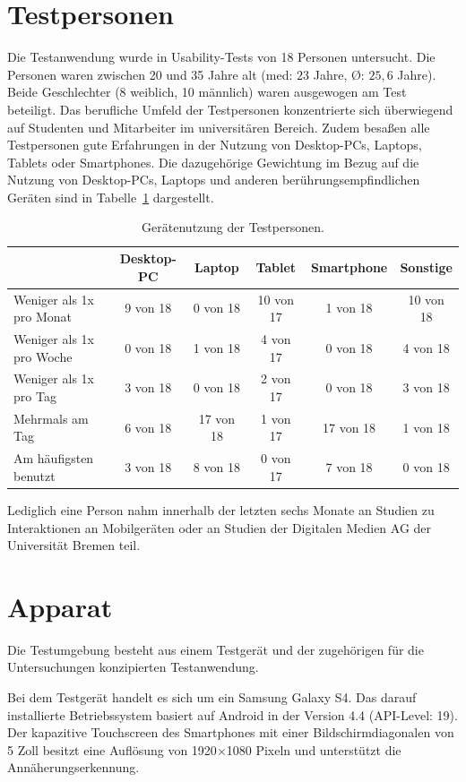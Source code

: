\documentclass[12pt,numbers=noenddot,parskip,bibliography=totocnumbered,listof=totocnumbered]{scrreprt}
\begin{document}
\section{Testpersonen}
Die Testanwendung wurde in Usability-Tests von 18 Personen untersucht. Die Personen waren zwischen 20 und 35 Jahre alt (med: $23$ Jahre, \O: $25{,}6$ Jahre). Beide Geschlechter (8 weiblich, 10 männlich) waren ausgewogen am Test beteiligt. Das berufliche Umfeld der Testpersonen konzentrierte sich überwiegend auf Studenten und Mitarbeiter im universitären Bereich. Zudem besaßen alle Testpersonen gute Erfahrungen in der Nutzung von Desktop-PCs, Laptops, Tablets oder Smartphones. Die dazugehörige Gewichtung im Bezug auf die Nutzung von Desktop-PCs, Laptops und anderen berührungsempfindlichen Geräten sind in Tabelle~\ref{nutzungtestpersonen} dargestellt.
\begin{table}
\centering
\renewcommand{\arraystretch}{2}
\setlength{\tabcolsep}{2.2pt}
\begin{tabular}{ p{4.8cm} | c c c c c}
& Desktop-PC & Laptop & Tablet & Smartphone & Sonstige\\\hline
Weniger als 1x pro Monat & 9 von 18 & 0 von 18 & 10 von 17 & 1 von 18 & 10 von 18 \\
Weniger als 1x pro Woche & 0 von 18 & 1 von 18 & 4 von 17 & 0 von 18 & 4 von 18 \\
Weniger als 1x pro Tag & 3 von 18 & 0 von 18 & 2 von 17 & 0 von 18 & 3 von 18 \\
Mehrmals am Tag & 6 von 18 & 17 von 18 & 1 von 17 & 17 von 18 & 1 von 18 \\
\hline
Am häufigsten benutzt & 3 von 18 & 8 von 18 & 0 von 17 & 7 von 18 & 0 von 18 \\
\end{tabular}
\caption{Gerätenutzung der Testpersonen.}
\label{nutzungtestpersonen}
\end{table}
Lediglich eine Person nahm innerhalb der letzten sechs Monate an Studien zu Interaktionen an Mobilgeräten oder an Studien der Digitalen Medien AG der Universität Bremen teil.

\section{Apparat}
Die Testumgebung besteht aus einem Testgerät und der zugehörigen für die Untersuchungen konzipierten Testanwendung.

Bei dem Testgerät handelt es sich um ein Samsung Galaxy S4. Das darauf installierte Betriebssystem basiert auf Android in der Version 4.4 (API-Level: 19). Der kapazitive Touchscreen des Smartphones mit einer Bildschirmdiagonalen von 5 Zoll besitzt eine Auflösung von 1920$\times$1080 Pixeln und unterstützt die Annäherungserkennung.
\end{document}
